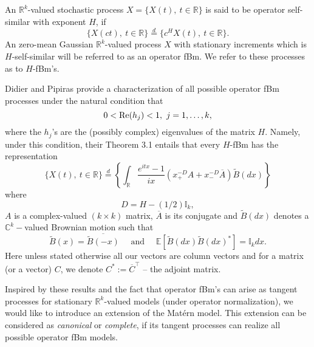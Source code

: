 \documentclass[11pt]{article}
\def\E{\mathbb E}
\def\C{\mathbb C}
\def\I{\mathbb I}
\def\R{\mathbb R}
\def\eqd{\stackrel{d}{=}}
\theoremstyle{plain}
\theoremstyle{definition}
\theoremstyle{condition}
\theoremstyle{remark}
\begin{document}
  An $\R^k$-valued stochastic process $X = \{X(t),\ t\in\R\}$ is said to be operator self-similar with exponent $H$, if 
  $$
  \{X(ct),\ t\in \R\} \eqd \{ c^H X(t),\ t\in \R\}.
  $$
  An zero-mean Gaussian $\R^k$-valued process $X$ 
  with stationary increments which is $H$-self-similar will be referred to as an operator fBm.  We refer to these processes as to
  $H$-fBm's.
  
   Didier and Pipiras \cite{didier:pipiras:2011} provide a characterization of all possible operator fBm processes under the natural condition that
   $$
   0 < {\rm Re}(h_j) <1,\ j=1,\dots,k,
   $$
   where the $h_j$'s are the (possibly complex) eigenvalues of the matrix $H$.   Namely, under this condition,
   their Theorem 3.1 entails that every $H$-fBm has the representation
   \begin{equation}\label{e:diddier-pipiras}
   \{X(t),\ t\in \R\} \eqd \left\{ \int_{\R} \frac{e^{itx} -1}{ix} ( x_+^{-D}A + x_-^{-D}\overline{A}) \tilde B(dx)\right\}
   \end{equation}
   where
   $$
   D = H - (1/2)\I_k,
   $$
   $A$  is a complex-valued $(k\times k)$ matrix, $\overline A$ is its conjugate and $\tilde B(dx)$ denotes a $\C^k-$valued Brownian motion such that
   $$
   \tilde B(x) = \overline {\tilde B(-x)}\quad \mbox{ and }\quad \E [\tilde B(dx) \tilde B(dx)^*] = \I_k dx.
   $$
   Here unless stated otherwise all our vectors are column vectors and for a matrix (or a vector) $C$, we denote $C^*:= \overline C^\top$ -- the adjoint matrix.
   
   Inspired by these results and the fact that operator fBm's can arise as tangent processes for stationary $\R^k$-valued models (under operator normalization), we would like to introduce an
   extension of the Mat\'ern model.  This extension can be considered as {\em canonical} or {\em complete}, if its tangent processes can realize all possible operator fBm models.
   
\end{document}
